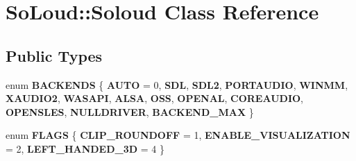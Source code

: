 \hypertarget{class_so_loud_1_1_soloud}{}\section{So\+Loud\+:\+:Soloud Class Reference}
\label{class_so_loud_1_1_soloud}
\subsection*{Public Types}
\begin{DoxyCompactItemize}
\item 
\mbox{\label{class_so_loud_1_1_soloud_ac96d355c9a04c9bccb5540ff93555264}} 
enum {\bfseries B\+A\+C\+K\+E\+N\+DS} \{ \newline
{\bfseries A\+U\+TO} = 0, 
{\bfseries S\+DL}, 
{\bfseries S\+D\+L2}, 
{\bfseries P\+O\+R\+T\+A\+U\+D\+IO}, 
\newline
{\bfseries W\+I\+N\+MM}, 
{\bfseries X\+A\+U\+D\+I\+O2}, 
{\bfseries W\+A\+S\+A\+PI}, 
{\bfseries A\+L\+SA}, 
\newline
{\bfseries O\+SS}, 
{\bfseries O\+P\+E\+N\+AL}, 
{\bfseries C\+O\+R\+E\+A\+U\+D\+IO}, 
{\bfseries O\+P\+E\+N\+S\+L\+ES}, 
\newline
{\bfseries N\+U\+L\+L\+D\+R\+I\+V\+ER}, 
{\bfseries B\+A\+C\+K\+E\+N\+D\+\_\+\+M\+AX}
 \}
\item 
\mbox{\label{class_so_loud_1_1_soloud_ae53f6fced10211ed39249c59bd24ad6b}} 
enum {\bfseries F\+L\+A\+GS} \{ {\bfseries C\+L\+I\+P\+\_\+\+R\+O\+U\+N\+D\+O\+FF} = 1, 
{\bfseries E\+N\+A\+B\+L\+E\+\_\+\+V\+I\+S\+U\+A\+L\+I\+Z\+A\+T\+I\+ON} = 2, 
{\bfseries L\+E\+F\+T\+\_\+\+H\+A\+N\+D\+E\+D\+\_\+3D} = 4
 \}
\end{DoxyCompactItemize}
